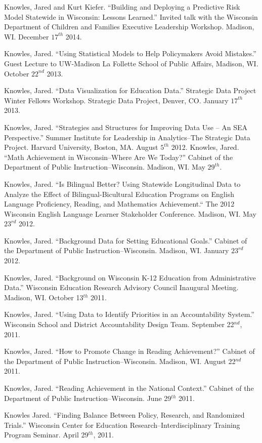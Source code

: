 \documentclass[margin,line]{res}
\begin{document}
\begin{resume}
Knowles, Jared and Kurt Kiefer. ``Building and Deploying a Predictive Risk Model Statewide in Wisconsin: Lessons Learned.'' Invited talk with the 
Wisconsin Department of Children and Families Executive Leadership Workshop. Madison, WI. December $17^{th}$ 2014.

Knowles, Jared. ``Using Statistical Models to Help Policymakers Avoid Mistakes.'' Guest Lecture to UW-Madison La Follette School of Public Affairs, Madison, WI. October $22^{nd}$ 2013.

Knowles, Jared. ``Data Visualization for Education Data.'' Strategic Data Project Winter Fellows Workshop. Strategic Data Project, Denver, CO. January $17^{th}$ 2013. 

Knowles, Jared. ``Strategies and Structures for Improving Data Use -- An SEA Perspective.'' Summer Institute for Leadership in Analytics--The Strategic Data Project. Harvard University, Boston, MA. August $5^{th}$ 2012. 
Knowles, Jared. ``Math Achievement in Wisconsin--Where Are We Today?'' Cabinet of the Department of Public Instruction--Wisconsin. Madison, WI. May $29^{th}$. 


Knowles, Jared. ``Is Bilingual Better? Using Statewide Longitudinal Data to Analyze the Effect of Bilingual-Bicultural Education Programs on English Language Proficiency, Reading, and Mathematics Achievement.`` The 2012 Wisconsin English Language Learner Stakeholder Conference. Madison, WI. May $23^{rd}$ 2012.

Knowles, Jared. ``Background Data for Setting Educational Goals.'' Cabinet of the Department of Public Instruction--Wisconsin. Madison, WI. January $23^{rd}$ 2012.

Knowles, Jared. ``Background on Wisconsin K-12 Education from Administrative Data.'' Wisconsin Education Research Advisory Council Inaugural Meeting. Madison, WI. October 13$^{th}$ 2011.

Knowles, Jared. ``Using Data to Identify Priorities in an Accountability System.'' Wisconsin School and District Accountability Design Team. September 22$^{nd}$, 2011.

Knowles, Jared. ``How to Promote Change in Reading Achievement?'' Cabinet of the Department of Public Instruction--Wisconsin. Madison, WI. August 22$^{nd}$ 2011.

Knowles, Jared. ``Reading Achievement in the National Context.'' Cabinet of the Department of Public Instruction--Wisconsin. June 29$^{th}$ 2011.

Knowles Jared. ``Finding Balance Between Policy, Research, and Randomized Trials.'' Wisconsin Center for Education Research--Interdisciplinary Training Program Seminar. April 29$^{th}$, 2011.


\end{resume}
\end{document}
